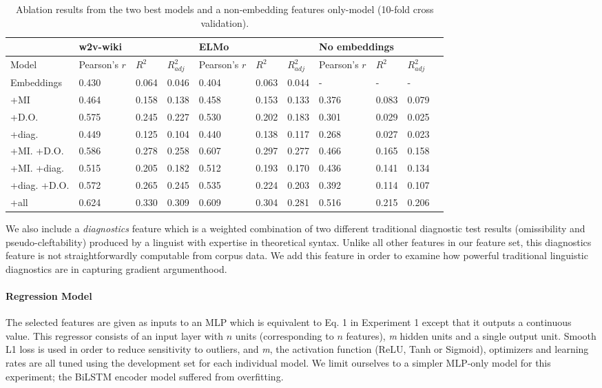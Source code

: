 \documentclass[letterpaper]{article} %
\begin{document}
\begin{table}[h]
	\centering
	\begin{tabular}{@{}lllllllllll@{}}
		\toprule
		& \multicolumn{3}{l}{w2v-wiki} & \multicolumn{3}{l}{ELMo} & \multicolumn{3}{l}{No embeddings}\\ \midrule
		Model       & Pearson's $r$ & $R^2$ & $R^2_{adj}$ & Pearson's $r$ & $R^2$ & $R^2_{adj}$ & Pearson's $r$  & $R^2$ & $R^2_{adj}$  \\ \midrule
		Embeddings &  0.430 & 0.064 & 0.046 \hspace{0.7cm} & 0.404 &  0.063 & 0.044 \hspace{0.7cm} & - & - & -\\
		{} {} {} {} +MI & 0.464 & 0.158  & 0.138 & 0.458 &  0.153 & 0.133 & 0.376 & 0.083 & 0.079 \\
		{} {} {} {} +D.O.  & 0.575 & 0.245 & 0.227 & 0.530 & 0.202 & 0.183 & 0.301 & 0.029 & 0.025\\
		{} {} {} {} +diag. & 0.449 & 0.125 & 0.104 & 0.440 & 0.138 & 0.117 & 0.268 & 0.027 & 0.023 \\
		{} {} {} {} +MI. +D.O.  & 0.586 & 0.278 & 0.258 & 0.607 & 0.297 & 0.277 & 0.466 & 0.165 & 0.158 \\
		{} {} {} {} +MI. +diag. & 0.515 & 0.205 & 0.182 & 0.512 & 0.193 & 0.170 & 0.436 & 0.141 & 0.134  \\
		{} {} {} {} +diag. +D.O. & 0.572 & 0.265 & 0.245 & 0.535 & 0.224 & 0.203 & 0.392 & 0.114 & 0.107 \\
		{} {} {} {} +all & 0.624 & 0.330  & 0.309 & 0.609 & 0.304 & 0.281
		&  0.516 & 0.215 & 0.206 \\
		\bottomrule
	\end{tabular}
	\caption{Ablation results from the two best models and a non-embedding features only-model (10-fold cross validation).}
	\label{ex2:ablation-2}
\end{table}

We also include a \textit{diagnostics} feature which is a weighted combination of two different traditional diagnostic test results (omissibility and pseudo-cleftability) produced by a linguist with expertise in theoretical syntax. Unlike all other features in our feature set, this diagnostics feature is not straightforwardly computable from corpus data. We add this feature in order to examine how powerful traditional linguistic diagnostics are in capturing gradient argumenthood.

\paragraph{Regression Model}
The selected features are given as inputs to an MLP which is equivalent to Eq. 1 in Experiment 1 except that it outputs a continuous value. This regressor consists of an input layer with $n$ units (corresponding to $n$ features), \textit{m} hidden units and a single output unit. Smooth L1 loss is used in order to reduce sensitivity to outliers, and \textit{m}, the activation function (ReLU, Tanh or Sigmoid), optimizers and learning rates are all tuned using the development set for each individual model. We limit ourselves to a simpler MLP-only model for this experiment; the BiLSTM encoder model suffered from overfitting.
\end{document}
